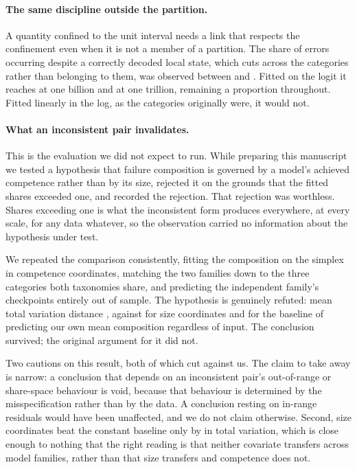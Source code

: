 \documentclass[11pt]{article}
\begin{document}
\paragraph{The same discipline outside the partition.}
A quantity confined to the unit interval needs a link that respects the confinement
even when it is not a member of a partition. The share of errors occurring despite
a correctly decoded local state, which cuts across the categories rather than
belonging to them, was observed between  and
. Fitted on the logit it reaches  at one
billion and  at one trillion, remaining a proportion throughout.
Fitted linearly in the log, as the categories originally were, it would not.

\paragraph{What an inconsistent pair invalidates.}
This is the evaluation we did not expect to run. While preparing this manuscript we
tested a hypothesis that failure composition is governed by a model's achieved
competence rather than by its size, rejected it on the grounds that the fitted shares
exceeded one, and recorded the rejection. That rejection was worthless. Shares
exceeding one is what the inconsistent form produces everywhere, at every scale, for
any data whatever, so the observation carried no information about the hypothesis
under test.

We repeated the comparison consistently, fitting the composition on the simplex in
competence coordinates, matching the two families down to the three categories both
taxonomies share, and predicting the independent family's checkpoints entirely out of
sample. The hypothesis is genuinely refuted: mean total variation distance
, against  for size coordinates and
 for the baseline of predicting our own mean composition
regardless of input. The conclusion survived; the original argument for it did not.

Two cautions on this result, both of which cut against us. The claim to take away is
narrow: a conclusion that depends on an inconsistent pair's out-of-range or
share-space behaviour is void, because that behaviour is determined by the
misspecification rather than by the data. A conclusion resting on in-range residuals
would have been unaffected, and we do not claim otherwise. Second, size coordinates
beat the constant baseline only by  in total variation, which
is close enough to nothing that the right reading is that neither covariate transfers
across model families, rather than that size transfers and competence does not.
\end{document}
